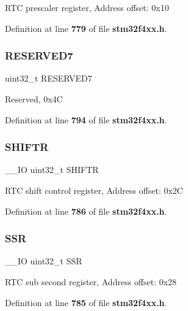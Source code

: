R\+TC prescaler register, Address offset\+: 0x10 

Definition at line \textbf{ 779} of file \textbf{ stm32f4xx.\+h}.

\mbox{\label{structRTC__TypeDef_a6be3d40baea405ecaf6b38462357dac0}} 
\subsubsection{R\+E\+S\+E\+R\+V\+E\+D7}
{\footnotesize\ttfamily uint32\+\_\+t R\+E\+S\+E\+R\+V\+E\+D7}

Reserved, 0x4C 

Definition at line \textbf{ 794} of file \textbf{ stm32f4xx.\+h}.

\mbox{\label{structRTC__TypeDef_a2372c05a6c5508e0a9adada793f68b4f}} 
\subsubsection{S\+H\+I\+F\+TR}
{\footnotesize\ttfamily \+\_\+\+\_\+\+IO uint32\+\_\+t S\+H\+I\+F\+TR}

R\+TC shift control register, Address offset\+: 0x2C 

Definition at line \textbf{ 786} of file \textbf{ stm32f4xx.\+h}.

\mbox{\label{structRTC__TypeDef_a8a868e5e76b52ced04c536be3dee08ec}} 
\subsubsection{S\+SR}
{\footnotesize\ttfamily \+\_\+\+\_\+\+IO uint32\+\_\+t S\+SR}

R\+TC sub second register, Address offset\+: 0x28 

Definition at line \textbf{ 785} of file \textbf{ stm32f4xx.\+h}.

\mbox{\label{structRTC__TypeDef_a14d03244a7fda1d94b51ae9ed144ca12}} 
